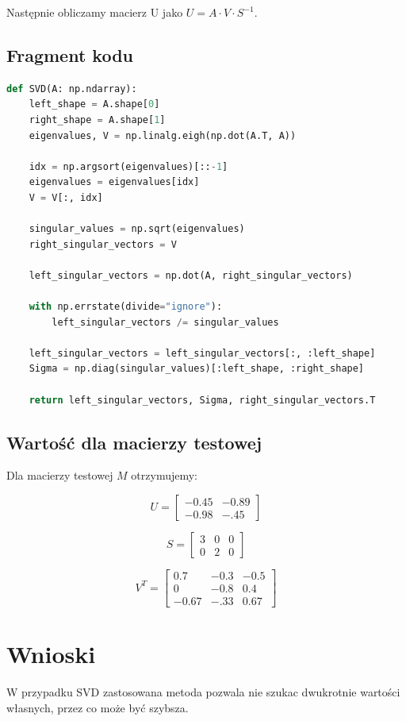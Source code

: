 \documentclass[a4paper]{article}
\begin{document}
Następnie obliczamy macierz U jako \(U = A \cdot V \cdot S^{-1}\).

\subsection{Fragment kodu}

\begin{lstlisting}[language=python]
def SVD(A: np.ndarray):
    left_shape = A.shape[0]
    right_shape = A.shape[1]
    eigenvalues, V = np.linalg.eigh(np.dot(A.T, A))

    idx = np.argsort(eigenvalues)[::-1]
    eigenvalues = eigenvalues[idx]
    V = V[:, idx]

    singular_values = np.sqrt(eigenvalues)
    right_singular_vectors = V

    left_singular_vectors = np.dot(A, right_singular_vectors)

    with np.errstate(divide="ignore"):
        left_singular_vectors /= singular_values

    left_singular_vectors = left_singular_vectors[:, :left_shape]
    Sigma = np.diag(singular_values)[:left_shape, :right_shape]

    return left_singular_vectors, Sigma, right_singular_vectors.T

\end{lstlisting}

\subsection{Wartość dla macierzy testowej}

Dla macierzy testowej $M$ otrzymujemy:

\[
    U =
\begin{bmatrix}
    -0.45 & -0.89\\
    -0.98 & -.45
\end{bmatrix}
\]

\[
    S =
\begin{bmatrix}
    3 & 0 & 0\\
    0 & 2 & 0
\end{bmatrix}
\]

\[
    V^T =
\begin{bmatrix}
    0.7 & -0.3 & -0.5\\
    0 & -0.8 & 0.4\\
    -0.67 & -.33  & 0.67
\end{bmatrix}
\]

\section{Wnioski}

W przypadku SVD zastosowana metoda pozwala nie szukac dwukrotnie wartości własnych, przez co
może być szybsza.
\end{document}
